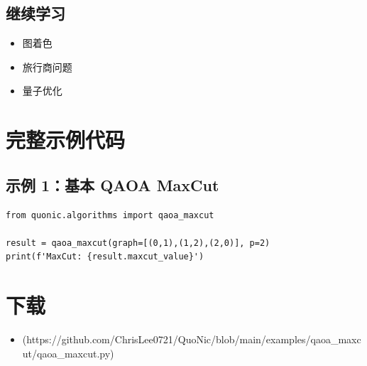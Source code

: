 \documentclass[12pt,a4paper]{article}
\begin{document}
\subsection{继续学习}
\begin{itemize}
  \item 图着色
  \item 旅行商问题
  \item 量子优化
\end{itemize}

\section{完整示例代码}

\subsection{示例 1：基本 QAOA MaxCut}

\begin{verbatim}
from quonic.algorithms import qaoa_maxcut

result = qaoa_maxcut(graph=[(0,1),(1,2),(2,0)], p=2)
print(f'MaxCut: {result.maxcut_value}')
\end{verbatim}

\section{下载}

\begin{itemize}
  \item [qaoa\_maxcut.py](https://github.com/ChrisLee0721/QuoNic/blob/main/examples/qaoa_maxcut/qaoa_maxcut.py)
\end{itemize}
\end{document}
